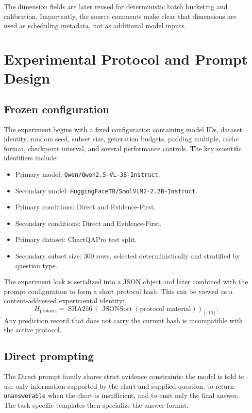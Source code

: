 \documentclass[11pt,a4paper]{article}
\newcommand{\code}[1]{\texttt{#1}}
\begin{document}
The dimension fields are later reused for deterministic batch bucketing and calibration. Importantly, the source comments make clear that dimensions are used as scheduling metadata, not as additional model inputs.

\section{Experimental Protocol and Prompt Design}
\subsection{Frozen configuration}
The experiment begins with a fixed configuration containing model IDs, dataset identity, random seed, subset size, generation budgets, padding multiple, cache format, checkpoint interval, and several performance controls. The key scientific identifiers include:
\begin{itemize}
\item Primary model: \code{Qwen/Qwen2.5-VL-3B-Instruct}.
\item Secondary model: \code{HuggingFaceTB/SmolVLM2-2.2B-Instruct}.
\item Primary conditions: Direct and Evidence-First.
\item Secondary conditions: Direct and Evidence-First.
\item Primary dataset: ChartQAPro test split.
\item Secondary subset size: 300 rows, selected deterministically and stratified by question type.
\end{itemize}

The experiment lock is serialized into a JSON object and later combined with the prompt configuration to form a short protocol hash. This can be viewed as a content-addressed experimental identity:
\begin{equation}
H_{\mathrm{protocol}}
=
\operatorname{SHA256}\!\left(
\operatorname{JSONSort}(\text{protocol material})
\right)_{[:16]}.
\end{equation}
Any prediction record that does not carry the current hash is incompatible with the active protocol.

\subsection{Direct prompting}
The Direct prompt family shares strict evidence constraints: the model is told to use only information supported by the chart and supplied question, to return \code{unanswerable} when the chart is insufficient, and to emit only the final answer. The task-specific templates then specialize the answer format.
\end{document}
